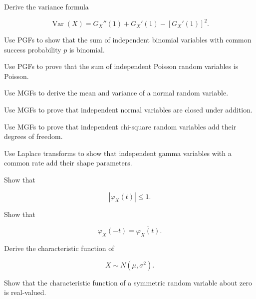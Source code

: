 \begin{exercise}[3]
Derive the variance formula

\[
\operatorname{Var}(X)
=
G_X''(1)
+
G_X'(1)
-
[G_X'(1)]^2.
\]
\end{exercise}

\begin{exercise}[3]
Use PGFs to show that the sum of independent binomial variables with
common success probability \(p\) is binomial.
\end{exercise}

\begin{exercise}[3]
Use PGFs to prove that the sum of independent Poisson random variables
is Poisson.
\end{exercise}

\begin{exercise}[3]
Use MGFs to derive the mean and variance of a normal random variable.
\end{exercise}

\begin{exercise}[3]
Use MGFs to prove that independent normal variables are closed under
addition.
\end{exercise}

\begin{exercise}[3]
Use MGFs to prove that independent chi-square random variables add their
degrees of freedom.
\end{exercise}

\begin{exercise}[3]
Use Laplace transforms to show that independent gamma variables with a
common rate add their shape parameters.
\end{exercise}

\begin{exercise}[3]
Show that

\[
|\varphi_X(t)|\leq1.
\]
\end{exercise}

\begin{exercise}[3]
Show that

\[
\varphi_X(-t)
=
\overline{\varphi_X(t)}.
\]
\end{exercise}

\begin{exercise}[3]
Derive the characteristic function of

\[
X\sim N(\mu,\sigma^2).
\]
\end{exercise}

\begin{exercise}[3]
Show that the characteristic function of a symmetric random variable
about zero is real-valued.
\end{exercise}

